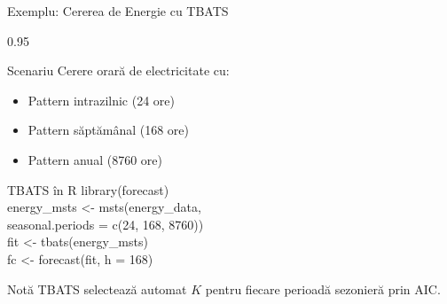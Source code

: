 \documentclass[9pt, aspectratio=169, t]{beamer}
\begin{document}
\begin{frame}{Exemplu: Cererea de Energie cu TBATS}
    \begin{cminipage}{0.95\textwidth}
    {\small
    \begin{block}{Scenariu}
        Cerere orară de electricitate cu:
        \begin{itemize}\setlength{\itemsep}{0pt}
            \item Pattern intrazilnic (24 ore)
            \item Pattern săptămânal (168 ore)
            \item Pattern anual (8760 ore)
        \end{itemize}
    \end{block}
    \begin{exampleblock}{TBATS în R}
        {\scriptsize\ttfamily
        library(forecast)\\[0.2em]
        energy\_msts <- msts(energy\_data,\\
        \quad seasonal.periods = c(24, 168, 8760))\\[0.2em]
        fit <- tbats(energy\_msts)\\
        fc <- forecast(fit, h = 168)
        }
    \end{exampleblock}
    \begin{alertblock}{Notă}
        TBATS selectează automat $K$ pentru fiecare perioadă sezonieră prin AIC.
    \end{alertblock}
    }
    \end{cminipage}
\end{frame}
\end{document}
